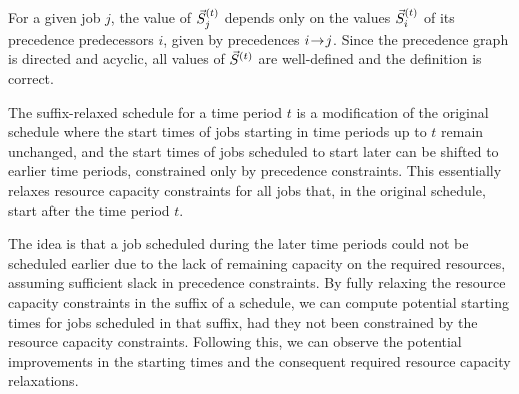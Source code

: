 
For a given job $j$, the value of $\vec{S}^{(t)}_{j}$
depends only on the values $\vec{S}^{(t)}_{i}$ of its precedence predecessors $i$,
given by precedences $i \hspace{-0.2em} \rightarrow \hspace{-0.2em} j$.
Since the precedence graph is directed and acyclic,
all values of $\vec{S}^{(t)}$ are well-defined and the definition is correct.

The suffix-relaxed schedule for a time period $t$ is a modification of the original schedule
where the start times of jobs starting in time periods up to $t$ remain unchanged,
and the start times of jobs scheduled to start later can be shifted to earlier time periods,
constrained only by precedence constraints.
This essentially relaxes resource capacity constraints for all jobs that, in the original schedule,
start after the time period $t$.

The idea is that a job scheduled during the later time periods could not be scheduled earlier
due to the lack of remaining capacity on the required resources,
assuming sufficient slack in precedence constraints.
By fully relaxing the resource capacity constraints in the suffix of a schedule,
we can compute potential starting times for jobs scheduled in that suffix,
had they not been constrained by the resource capacity constraints.
Following this, we can observe the potential improvements in the starting times
and the consequent required resource capacity relaxations.

